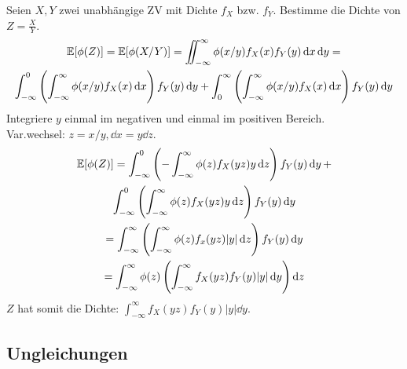 \begin{example}
	Seien $X,Y$ zwei unabhängige ZV mit Dichte $f_X$ bzw. $f_Y$. Bestimme die Dichte von $Z = \frac{X}{Y}$.
	\tcblower
	\begin{gather*}
		\mathbb{E} [\phi(Z)] = \mathbb{E} [\phi (X/Y)] = \iint_{-\infty}^{\infty} \phi(x/y) f_X(x) f_Y (y) \dd{x}\dd{y} = \\
		\int_{-\infty}^{0} \left( \int_{-\infty}^{\infty} \phi(x/y) f_X(x) \dd{x} \right) f_Y(y) \dd{y} + 
		\int_{0}^{\infty} \left( \int_{-\infty}^{\infty} \phi(x/y) f_X(x) \dd{x} \right) f_Y(y) \dd{y}
	\end{gather*}
	Integriere $y$ einmal im negativen und einmal im positiven Bereich.\\
	Var.wechsel: $z = x/y, \dd{x} = y \dd{z}$.
	\begin{gather*}
		\mathbb{E}[\phi(Z)] = \int_{-\infty}^{0} \left( - \int_{-\infty}^{\infty} \phi(z) f_X(yz) y \dd{z} \right) f_Y(y) \dd{y}
		+\\
		\int_{-\infty}^{0} \left(\int_{-\infty}^{\infty} \phi(z) f_X(yz) y \dd{z} \right) f_Y(y) \dd{y}\\
		= \int_{-\infty}^{\infty} \left( \int_{-\infty}^{\infty} \phi (z) f_x(yz) |y| \dd{z} \right) f_Y(y)\dd{y} \\
		= \int_{-\infty}^{\infty} \phi(z) \left( \int_{-\infty}^{\infty} f_X (yz) f_Y (y) |y| \dd{y} \right) \dd{z}
	\end{gather*}
	$Z$ hat somit die Dichte: $\int_{-\infty}^{\infty} f_X (yz) f_Y (y) |y| \dd{y}$.
\end{example}


\subsection{Ungleichungen}%
\label{sub:ungleichungen}

